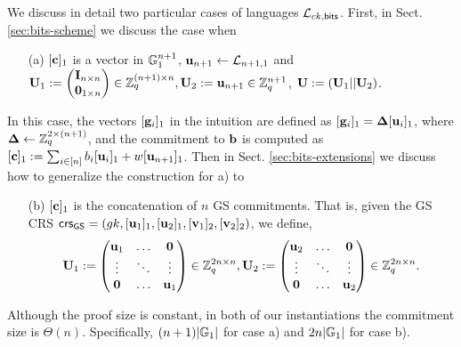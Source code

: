 We discuss in detail two particular cases of languages $\mathcal{\mathcal{L}}_{ck,\mathsf{bits}}$. First, in Sect. \ref{sec:bits-scheme} we discuss the case when 
\begin{itemize}
\item[(a)] $[\mathbf{c}]_1$ is a vector in $\mathbb{G}_1^{n+1}$,  $\mathbf{u}_{n+1} \leftarrow \mathcal{L}_{n+1,1}$ and
 $\mathbf{{U}}_1:=\begin{pmatrix}{\mathbf{{I}}_{n\times n}}\\{\mathbf{{0}}_{1\times n}}\end{pmatrix} \in \mathbb{Z}_q^{(n+1) \times n}, \mathbf{{U}}_2:=\mathbf{u}_{n+1} \in \mathbb{Z}_q^{n+1}$, $\mathbf{{U}}:=(\mathbf{{U}}_1|| \mathbf{{U}}_2)$.    
\end{itemize}
In this case, the vectors $[\mathbf{g}_i]_1$ in the intuition are defined as $[\mathbf{g}_i]_1=\mathbf{{\Delta}} [\mathbf{u}_i]_1$, where $\mathbf{{\Delta}}\gets\mathbb{Z}_q^{2\times(n+1)}$, and the commitment 
to $\mathbf{b}$ is computed as $[\mathbf{c}]_1:=\sum_{i\in[n]}b_i[\mathbf{u}_i]_1+w[\mathbf{u}_{n+1}]_1$.
Then in Sect. \ref{sec:bits-extensions} we discuss how to generalize the construction for a) to 
\begin{itemize}
 \item[(b)] $[\mathbf{c}]_1$ is the concatenation of $n$ GS commitments. That is, given the  GS CRS   $\mathsf{crs}_{\mathsf{GS}}=(gk,[\mathbf{u}_1]_1,[\mathbf{u}_2]_1,[\mathbf{v}_1]_2,[\mathbf{v}_2]_2)$, we define,
$$\mathbf{{U}}_1:=  \begin{pmatrix} \mathbf{u}_1 & \ldots & \mathbf{0}\\ \vdots & \ddots & \vdots \\   \mathbf{0} & \ldots & \mathbf{u}_1  \end{pmatrix} \in \mathbb{Z}_q^{2n \times n},  \mathbf{{U}}_2:= \begin{pmatrix} \mathbf{u}_2 & \ldots & \mathbf{0}\\ \vdots & \ddots & \vdots \\  \mathbf{0} & \ldots & \mathbf{u}_2  \end{pmatrix} \in \mathbb{Z}_q^{2n \times n}.$$ 
\end{itemize}

Although the proof size is constant, in both of our instantiations the commitment size is $\Theta(n)$. Specifically, $(n+1)|\mathbb{G}_1|$ for case a) and $2n|\mathbb{G}_1|$ for case b).


